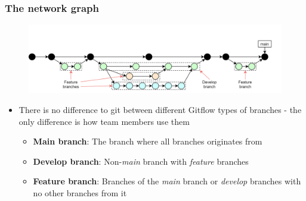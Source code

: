 \documentclass[aspectratio=169]{beamer} %
\begin{document}
\begin{frame}
	\frametitle{The network graph}

	\vspace{-.5cm}
	\begin{minipage}[t][5cm][t]{\textwidth}
		\begin{figure}
			\centering
			\includegraphics[width=\textwidth]{./img/dime-gitflow-network-names.png}
		\end{figure}
	\end{minipage}

	\vspace{-1cm}
	\begin{minipage}[t][5cm][t]{\textwidth}
		\begin{itemize}
			\setlength\itemsep{.4em}
			\item There is no difference to git between
			different Gitflow types of branches
			- the only difference is how team members use them
			\begin{itemize}
				\setlength\itemsep{.5em}
				\item \textbf{Main branch}:
				The branch where all branches originates from
				\item \textbf{Develop branch}:
				Non-\textit{main} branch with \textit{feature} branches
				\item \textbf{Feature branch}:
				Branches of the \textit{main} branch or
				\textit{develop} branches with no other branches from it
			\end{itemize}
		\end{itemize}
	\end{minipage}
\end{frame}
\end{document}
